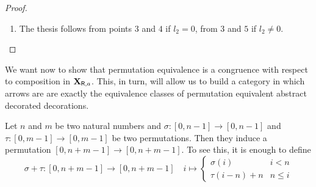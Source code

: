 \begin{proof}
\begin{enumerate}
			\item  The thesis follows from points $3$ and $4$ if $l_2=0$, from $3$ and $5$ if $l_2\neq 0$.	\qedhere
	\end{enumerate}
\end{proof}


We want now to show that permutation equivalence is a congruence with respect to composition in $\textbf {\textup{X}}_{\mathsf{R}, a}$. This, in turn, will allow us to build  a category in which arrows are are exactly the equivalence classes of permutation equivalent abstract decorated decorations.


\begin{remark}\label{rem:sum}
	Let $n$ and $m$ be two natural numbers and $\sigma\colon [0, n-1]\to [0,n-1]$ and $\tau\colon [0, m-1]\to [0,m-1]$ be two permutations. Then they induce a permutation $[0, n+m-1]\to [0, n+m-1]$. To see this, it is enough to define
		\[\sigma+\tau\colon[0, n+m-1]\to[0, n+m-1] \quad i \mapsto \begin{cases}
		\sigma(i) & i < n\\
		\tau(i-n) + n &  n\leq i 
	\end{cases}\]
\end{remark}



